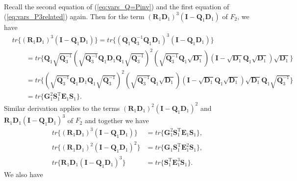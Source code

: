 \documentclass[12pt]{article}
\begin{document}
Recall the second equation of (\ref{eq:vars_Q=Pinv}) and the first equation of (\ref{eq:vars_P3related}) again. Then for the term $(\mathbf{R}_1 \mathbf{D}_1)^3 (\mathbf{I} - \mathbf{Q}_1 \mathbf{D}_1)$ of $F_2$, we have
\begin{align*}
& tr\{ (\mathbf{R}_1 \mathbf{D}_1)^3 (\mathbf{I} - \mathbf{Q}_1 \mathbf{D}_1) \} = tr\{ (\mathbf{Q}_1 \mathbf{Q}_3^{-1} \mathbf{Q}_1 \mathbf{D}_1)^3 (\mathbf{I} - \mathbf{Q}_1 \mathbf{D}_1) \}  \\
& \qquad = tr\{ \mathbf{Q}_1 \sqrt{\mathbf{Q}_3^{-1}} (\sqrt{\mathbf{Q}_3^{-1}} \mathbf{Q}_1 \mathbf{D}_1 \mathbf{Q}_1 \sqrt{\mathbf{Q}_3^{-1}})^2 (\sqrt{\mathbf{Q}_3^{-1}} \mathbf{Q}_1 \sqrt{\mathbf{D}_1}) (\mathbf{I} - \sqrt{\mathbf{D}_1} \mathbf{Q}_1 \sqrt{\mathbf{D}_1}) \sqrt{\mathbf{D}_1} \}  \\
& \qquad = tr\{ (\sqrt{\mathbf{Q}_3^{-1}} \mathbf{Q}_1 \mathbf{D}_1 \mathbf{Q}_1 \sqrt{\mathbf{Q}_3^{-1}})^2 (\sqrt{\mathbf{Q}_3^{-1}} \mathbf{Q}_1 \sqrt{\mathbf{D}_1}) (\mathbf{I} - \sqrt{\mathbf{D}_1} \mathbf{Q}_1 \sqrt{\mathbf{D}_1}) \sqrt{\mathbf{D}_1} \mathbf{Q}_1 \sqrt{\mathbf{Q}_3^{-1}} \}  \\
& \qquad = tr\{ \mathbf{G}_1^2 \mathbf{S}_1^{\mathrm{T}} \mathbf{E}_1 \mathbf{S}_1 \}.
\end{align*}
Similar derivation applies to the terms $(\mathbf{R}_1 \mathbf{D}_1)^2 (\mathbf{I} - \mathbf{Q}_1 \mathbf{D}_1)^2$ and $\mathbf{R}_1 \mathbf{D}_1 (\mathbf{I} - \mathbf{Q}_1 \mathbf{D}_1)^3$ of $F_2$ and together we have
\begin{subequations}  \label{eq:dif4_F2_a}
\begin{align}  
tr\{ (\mathbf{R}_1 \mathbf{D}_1)^3 (\mathbf{I} - \mathbf{Q}_1 \mathbf{D}_1) \} &= tr\{ \mathbf{G}_1^2 \mathbf{S}_1^{\mathrm{T}} \mathbf{E}_1 \mathbf{S}_1 \},  \\
tr\{ (\mathbf{R}_1 \mathbf{D}_1)^2 (\mathbf{I} - \mathbf{Q}_1 \mathbf{D}_1)^2 \} &= tr\{ \mathbf{G}_1 \mathbf{S}_1^{\mathrm{T}} \mathbf{E}_1^2 \mathbf{S}_1 \},  \\
tr\{ \mathbf{R}_1 \mathbf{D}_1 (\mathbf{I} - \mathbf{Q}_1 \mathbf{D}_1)^3 \} &= tr\{ \mathbf{S}_1^{\mathrm{T}} \mathbf{E}_1^3 \mathbf{S}_1 \}.
\end{align}
\end{subequations}
We also have
\end{document}
